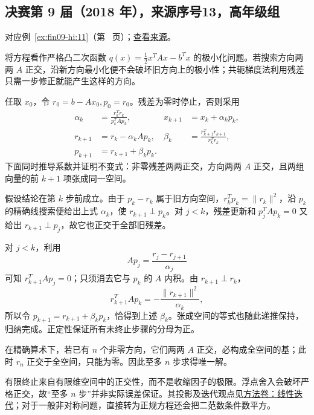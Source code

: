 \documentclass[12pt,fontset=fandol]{ctexart}
\begin{document}
\subsection{决赛第 9 届（2018 年），来源序号13，高年级组}\label{ans:fin09-hi:11}\label{pr:fin09-hi:11}

对应例~\ref{ex:fin09-hi:11}（第~\pageref{ex:fin09-hi:11} 页）；\href{https://github.com/lzxcr/cmc-mathematics/blob/64916fa1fdbc3e444a652eca204d5669058ee321/src/problems/finals/09/13.md}{查看来源}。

\begin{solve}

将方程看作严格凸二次函数 $q(x)=\frac12x^TAx-b^Tx$ 的极小化问题。若搜索方向两两 $A$ 正交，沿新方向最小化便不会破坏旧方向上的极小性；共轭梯度法利用残差只需一步修正就能产生这样的方向。

任取 $x_0$，令 $r_0=b-Ax_0,p_0=r_0$。残差为零时停止，否则采用
\[
\begin{aligned}
\alpha_k&=\frac{r_k^Tr_k}{p_k^TAp_k},&x_{k+1}&=x_k+\alpha_kp_k,\\
r_{k+1}&=r_k-\alpha_kAp_k,&\beta_k&=\frac{r_{k+1}^Tr_{k+1}}{r_k^Tr_k},\\
p_{k+1}&=r_{k+1}+\beta_kp_k.
\end{aligned}
\]
下面同时推导系数并证明不变式：非零残差两两正交，方向两两 $A$ 正交，且两组向量的前 $k+1$ 项张成同一空间。

假设结论在第 $k$ 步前成立。由于 $p_k-r_k$ 属于旧方向空间，$r_k^Tp_k=\|r_k\|^2$，沿 $p_k$ 的精确线搜索便给出上式 $\alpha_k$，使 $r_{k+1}\perp p_k$。对 $j<k$，残差更新和 $p_j^TAp_k=0$ 又给出 $r_{k+1}\perp p_j$，故它也正交于全部旧残差。

对 $j<k$，利用
\[
Ap_j=\frac{r_j-r_{j+1}}{\alpha_j}
\]
可知 $r_{k+1}^TAp_j=0$；只须消去它与 $p_k$ 的 $A$ 内积。由 $r_{k+1}\perp r_k$，
\[
r_{k+1}^TAp_k=-\frac{\|r_{k+1}\|^2}{\alpha_k},
\]
所以令 $p_{k+1}=r_{k+1}+\beta_kp_k$，恰得到上述 $\beta_k$。张成空间的等式也随此递推保持，归纳完成。正定性保证所有未终止步骤的分母为正。

在精确算术下，若已有 $n$ 个非零方向，它们两两 $A$ 正交，必构成全空间的基；此时 $r_n$ 正交于全空间，只能为零。因此至多 $n$ 步求得唯一解。

\end{solve}

\begin{remark}[方法与条件]

有限终止来自有限维空间中的正交性，而不是收缩因子的极限。浮点舍入会破坏严格正交，故“至多 $n$ 步”并非实际误差保证。其投影及迭代观点见\hyperref[app:linear-iteration]{方法卷：线性迭代}；对于一般非对称问题，直接转为正规方程还会把二范数条件数平方。

\end{remark}
\end{document}
